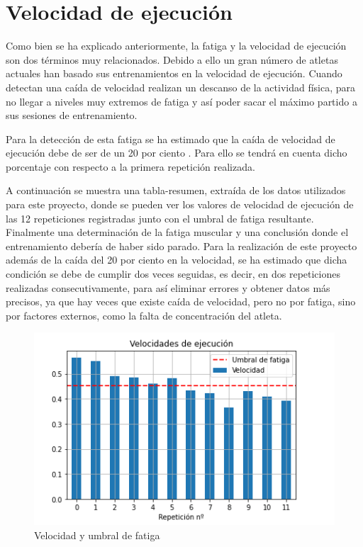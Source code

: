 \newpage
\section{Velocidad de ejecución \label{velo condicion}}
Como bien se ha explicado anteriormente, la fatiga y la velocidad de ejecución son dos términos muy relacionados. Debido a ello un gran número de atletas actuales han basado sus entrenamientos en la velocidad de ejecución. Cuando detectan una caída de velocidad realizan un descanso de la actividad física, para no llegar a niveles muy extremos de fatiga y así poder sacar el máximo partido a sus sesiones de entrenamiento.

Para la detección de esta fatiga se ha estimado que la caída de velocidad de ejecución debe de ser de un 20 por ciento \cite{fernandezpropuesta}. Para ello se tendrá en cuenta dicho porcentaje con respecto a la primera repetición realizada.

A continuación se muestra una tabla-resumen, extraída de los datos utilizados para este proyecto, donde se pueden ver los valores de velocidad de ejecución de las 12 repeticiones registradas junto con el umbral de fatiga resultante. Finalmente una determinación de la fatiga muscular y una conclusión donde el entrenamiento debería de haber sido parado. Para la realización de este proyecto además de la caída del 20 por ciento en la velocidad, se ha estimado que dicha condición se debe de cumplir dos veces seguidas, es decir, en dos repeticiones realizadas consecutivamente, para así eliminar errores y obtener datos más precisos, ya que hay veces que existe caída de velocidad, pero no por fatiga, sino por factores externos, como la falta de concentración del atleta. 


\begin{figure}[ht]
\centering
\includegraphics[scale=0.8]{imagenes/velocidades y fatiga.png}
\caption{Velocidad y umbral de fatiga}
\label{fig:fatiga}
\end{figure}

